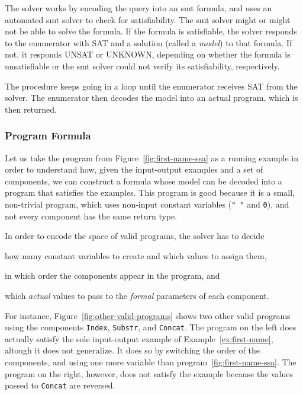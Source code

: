 The solver works by encoding the query into an \gls{smt} formula, and uses an
automated \gls{smt} solver to check for satisfiability. The \gls{smt} solver
might or might not be able to solve the formula. If the formula is satisfiable,
the solver responds to the enumerator with SAT and a solution (called a
\textit{model}) to that formula. If not, it responds UNSAT or UNKNOWN, depending
on whether the formula is unsatisfiable or the \gls{smt} solver could not verify
its satisfiability, respectively.

The procedure keeps going in a loop until the enumerator receives SAT from the
solver. The enumerator then decodes the model into an actual program, which is
then returned.

\subsubsection{Program Formula}
\label{sec:program-formula}

Let us take the program from Figure~\ref{fig:first-name-ssa} as a running
example in order to understand how, given the input-output examples and a set of
components, we can construct a formula whose model can be decoded into a program
that satisfies the examples. This program is good because it is a small,
non-trivial program, which uses non-input constant variables (\lstinline{" "}
and \lstinline{0}), and not every component has the same return type.

In order to encode the space of valid programs, the solver has to decide
\begin{enumerate*}[(1)]
\item how many constant variables to create and which values to assign them,
\item in which order the components appear in the program, and
\item which \textit{actual} values to pass to the \textit{formal} parameters of
  each component.
\end{enumerate*}

For instance, Figure~\ref{fig:other-valid-programs} shows two other valid
programs using the components \lstinline{Index}, \lstinline{Substr}, and
\lstinline{Concat}. The program on the left does actually satisfy the sole
input-output example of Example~\ref{ex:first-name}, altough it does not
generalize. It does so by switching the order of the components, and using one
more variable than program~\ref{fig:first-name-ssa}. The program on the right,
however, does not satisfy the example because the values passed to
\lstinline{Concat} are reversed.

